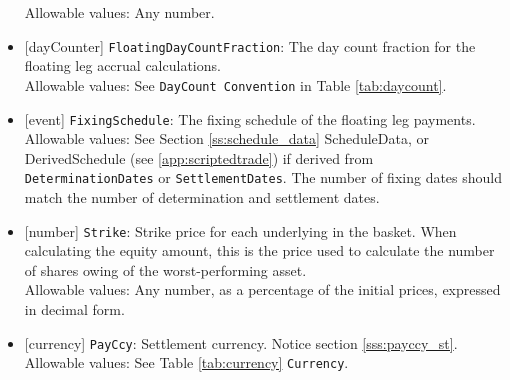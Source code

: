 \begin{itemize}
  Allowable values: Any number.
  \item{}[dayCounter] \lstinline!FloatingDayCountFraction!: The day count fraction for the floating leg accrual
  calculations. \\
  Allowable values: See \lstinline!DayCount Convention! in Table \ref{tab:daycount}.
  \item{}[event] \lstinline!FixingSchedule!: The fixing schedule of the floating leg payments. \\
  Allowable values: See Section \ref{ss:schedule_data} ScheduleData, or DerivedSchedule (see \ref{app:scriptedtrade}) if
  derived from \lstinline!DeterminationDates! or \lstinline!SettlementDates!. The number of fixing dates should
  match the number of determination and settlement dates.
  \item{}[number] \lstinline!Strike!: Strike price for each underlying in the basket. When calculating the equity amount,
  this is the price used to calculate the number of shares owing of the worst-performing asset. \\
  Allowable values: Any number, as a percentage of the initial prices, expressed in decimal form.
  \item{}[currency] \lstinline!PayCcy!: Settlement currency. Notice section \ref{sss:payccy_st}. \\
  Allowable values: See Table \ref{tab:currency} \lstinline!Currency!.
\end{itemize}